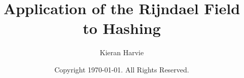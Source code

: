 \documentclass[12pt]{report}
\title{Application of the Rijndael Field to Hashing}
\date{Copyright \textcopyright  \today. All Rights Reserved.}
\author{Kieran Harvie}
\begin{document}
\maketitle
\tableofcontents






\renewcommand{\thechapter}{A}

\end{document}
